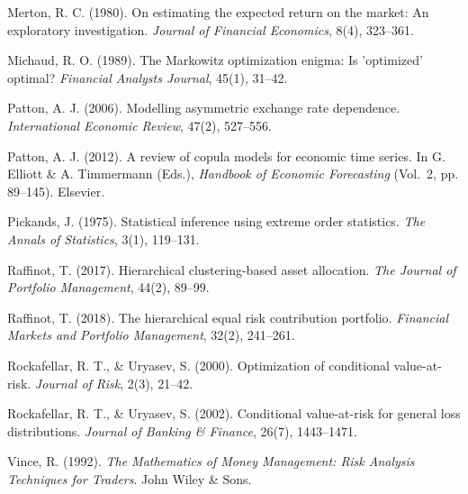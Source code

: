 \documentclass[11pt,a4paper]{article}
\begin{document}
Merton, R. C. (1980). On estimating the expected return on the market: An exploratory investigation. \textit{Journal of Financial Economics}, 8(4), 323--361.

Michaud, R. O. (1989). The Markowitz optimization enigma: Is 'optimized' optimal? \textit{Financial Analysts Journal}, 45(1), 31--42.

Patton, A. J. (2006). Modelling asymmetric exchange rate dependence. \textit{International Economic Review}, 47(2), 527--556.

Patton, A. J. (2012). A review of copula models for economic time series. In G. Elliott \& A. Timmermann (Eds.), \textit{Handbook of Economic Forecasting} (Vol.~2, pp. 89--145). Elsevier.

Pickands, J. (1975). Statistical inference using extreme order statistics. \textit{The Annals of Statistics}, 3(1), 119--131.

Raffinot, T. (2017). Hierarchical clustering-based asset allocation. \textit{The Journal of Portfolio Management}, 44(2), 89--99.

Raffinot, T. (2018). The hierarchical equal risk contribution portfolio. \textit{Financial Markets and Portfolio Management}, 32(2), 241--261.

Rockafellar, R. T., \& Uryasev, S. (2000). Optimization of conditional value-at-risk. \textit{Journal of Risk}, 2(3), 21--42.

Rockafellar, R. T., \& Uryasev, S. (2002). Conditional value-at-risk for general loss distributions. \textit{Journal of Banking \& Finance}, 26(7), 1443--1471.

Vince, R. (1992). \textit{The Mathematics of Money Management: Risk Analysis Techniques for Traders}. John Wiley \& Sons.

\endgroup
\end{document}
